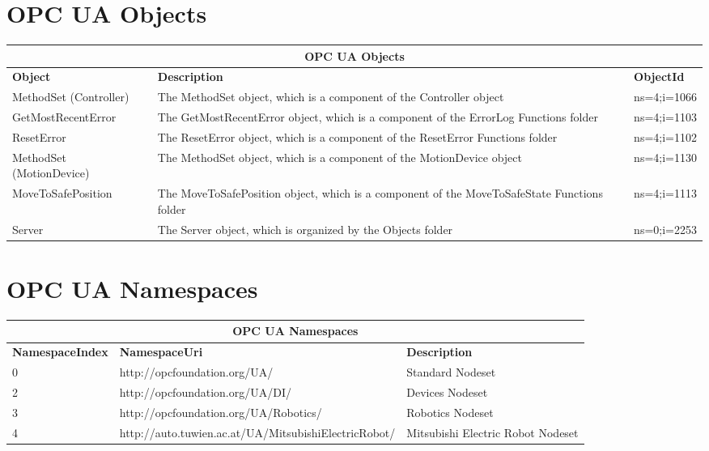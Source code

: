 \documentclass{article}
\begin{document}
\section{OPC UA Objects}
\begin{center}
	\setlength\extrarowheight{4pt}
	\small
	\begin{tabularx}{\textwidth}{|p{4cm}|X|p{2cm}|}
		\hline
		\multicolumn{3}{|c|}{\bf \color{black} \large OPC UA Objects}\\
		\hline\hline
		\bf Object &\bf Description & \bf ObjectId \\
		\hline\hline
		MethodSet (Controller) & The MethodSet object, which is a component of the Controller object & ns=4;i=1066 \\ \hline
		GetMostRecentError & The GetMostRecentError object, which is a component of the ErrorLog Functions folder & ns=4;i=1103 \\ \hline
		ResetError & The ResetError object, which is a component of the ResetError Functions folder & ns=4;i=1102 \\ \hline
		MethodSet (MotionDevice) & The MethodSet object, which is a component of the MotionDevice object & ns=4;i=1130 \\ \hline
		MoveToSafePosition & The MoveToSafePosition object, which is a component of the MoveToSafeState Functions folder & ns=4;i=1113 \\ \hline
		Server & The Server object, which is organized by the Objects folder & ns=0;i=2253 \\ \hline
	\end{tabularx}
\end{center}

\section{OPC UA Namespaces}
\begin{center}
	\setlength\extrarowheight{4pt}
	\small
	\begin{tabularx}{\textwidth}{|p{3cm}|p{8cm}|X|}
		\hline
		\multicolumn{3}{|c|}{\bf \color{black} \large OPC UA Namespaces}\\
		\hline\hline
		\bf NamespaceIndex &\bf NamespaceUri & \bf Description \\
		\hline\hline
		0 & http://opcfoundation.org/UA/ & Standard Nodeset\\ \hline
		2 & http://opcfoundation.org/UA/DI/ & Devices Nodeset\\ \hline
		3 & http://opcfoundation.org/UA/Robotics/ & Robotics Nodeset\\ \hline
		4 & http://auto.tuwien.ac.at/UA/MitsubishiElectricRobot/ & Mitsubishi Electric Robot Nodeset\\ \hline
	\end{tabularx}
\end{center}
\end{document}
